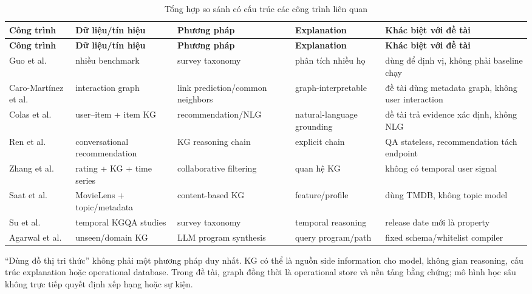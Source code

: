 \begin{longtable}{|>{\raggedright\arraybackslash}p{}|>{\raggedright\arraybackslash}p{}|>{\raggedright\arraybackslash}p{}|>{\raggedright\arraybackslash}p{}|>{\raggedright\arraybackslash}p{}|}
\caption{Tổng hợp so sánh có cấu trúc các công trình liên quan}\label{tab:1-1} \\
\hline
\textbf{Công trình} & \textbf{Dữ liệu/tín hiệu} & \textbf{Phương pháp} & \textbf{Explanation} & \textbf{Khác biệt với đề tài} \\ \hline
\endfirsthead\hline \textbf{Công trình} & \textbf{Dữ liệu/tín hiệu} & \textbf{Phương pháp} & \textbf{Explanation} & \textbf{Khác biệt với đề tài} \\ \hline\endhead
Guo et al. \cite{guo2023kgsurvey} & nhiều benchmark & survey taxonomy & phân tích nhiều họ & dùng để định vị, không phải baseline chạy \\ \hline
Caro-Martínez et al. \cite{caro2023graph} & interaction graph & link prediction/common neighbors & graph-interpretable & đề tài dùng metadata graph, không user interaction \\ \hline
Colas et al. \cite{colas2023knowledge} & user–item + item KG & recommendation/NLG & natural-language grounding & đề tài trả evidence xác định, không NLG \\ \hline
Ren et al. \cite{ren2024explicit} & conversational recommendation & KG reasoning chain & explicit chain & QA stateless, recommendation tách endpoint \\ \hline
Zhang et al. \cite{zhang2023movie} & rating + KG + time series & collaborative filtering & quan hệ KG & không có temporal user signal \\ \hline
Saat et al. \cite{saat2024enhanced} & MovieLens + topic/metadata & content-based KG & feature/profile & dùng TMDB, không topic model \\ \hline
Su et al. \cite{su2024temporal} & temporal KGQA studies & survey taxonomy & temporal reasoning & release date mới là property \\ \hline
Agarwal et al. \cite{agarwal2024byokg} & unseen/domain KG & LLM program synthesis & query program/path & fixed schema/whitelist compiler \\ \hline
\end{longtable}

“Dùng đồ thị tri thức” không phải một phương pháp duy nhất. KG có thể là nguồn
side information cho model, không gian reasoning, cấu trúc explanation hoặc
operational database. Trong đề tài, graph đồng thời là operational store và
nền tảng bằng chứng; mô hình học sâu không trực tiếp quyết định xếp hạng hoặc sự kiện.

